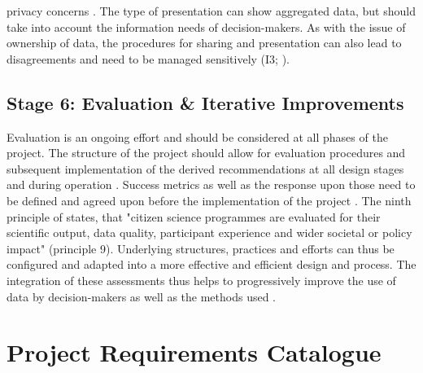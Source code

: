 privacy concerns \autocite{escaTenPrinciplesCitizen2015,sharpeCommunityBasedEcological2006}. The type of presentation can show aggregated data, but should take into account the information needs of decision-makers. As with the issue of ownership of data, the procedures for sharing and presentation can also lead to disagreements and need to be managed sensitively (I3; \cite{ifrcCommunityBasedSurveillanceGuiding2017}).

\subsection{Stage 6: Evaluation \& Iterative Improvements}\label{subsec:stage6_design}

Evaluation is an ongoing effort and should be considered at all phases of the project. The structure of the project should allow for evaluation procedures and subsequent implementation of the derived recommendations at all design stages and during operation \autocite{fraislCitizenScienceEnvironmental2022,ifrcCommunityBasedSurveillanceGuiding2017}. Success metrics as well as the response upon those need to be defined and agreed upon before the implementation of the project \autocite{fraislCitizenScienceEnvironmental2022,gualazziniEWEAEarlyWarning2021}. The ninth principle of \textcite{escaTenPrinciplesCitizen2015} states, that "citizen science programmes are evaluated for their scientific output, data quality, participant experience and wider societal or policy impact" (principle 9). Underlying structures, practices and efforts can thus be configured and adapted into a more effective and efficient design and process. The integration of these assessments thus helps to progressively improve the use of data by decision-makers as well as the methods used \autocite{fraislCitizenScienceEnvironmental2022}.


\section{Project Requirements Catalogue}\label{sec:prc}

